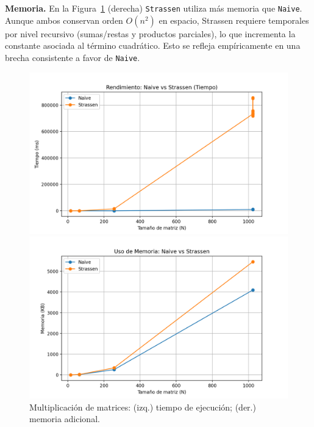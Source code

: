 \textbf{Memoria.} En la Figura~\ref{fig:matmul} (derecha) \texttt{Strassen} utiliza más memoria que \texttt{Naive}. Aunque ambos conservan orden $O(n^2)$ en espacio, Strassen requiere temporales por nivel recursivo (sumas/restas y productos parciales), lo que incrementa la constante asociada al término cuadrático. Esto se refleja empíricamente en una brecha consistente a favor de \texttt{Naive}.

\begin{figure}[H]
    \centering
    \begin{minipage}[t]{0.49\textwidth}
        \includegraphics[width=\textwidth]{../code/matrix_multiplication/data/plots/tiempo.png}
    \end{minipage}\hfill
    \begin{minipage}[t]{0.49\textwidth}
        \includegraphics[width=\textwidth]{../code/matrix_multiplication/data/plots/memoria.png}
    \end{minipage}
    \caption{Multiplicación de matrices: (izq.) tiempo de ejecución; (der.) memoria adicional.}
    \label{fig:matmul}
\end{figure}